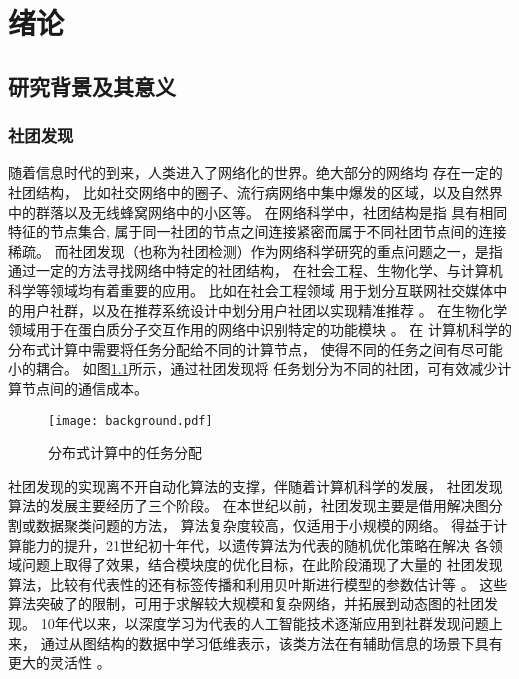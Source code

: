 
\chapter{绪论}


\section{研究背景及其意义}
\subsection{社团发现}
随着信息时代的到来，人类进入了网络化的世界。绝大部分的网络均
存在一定的社团结构\cite{fortunato2010community}，
比如社交网络中的圈子、流行病网络中集中爆发的区域，以及自然界中的群落以及无线蜂窝网络中的小区等。
在网络科学中，社团结构是指
具有相同特征的节点集合, 属于同一社团的节点之间连接紧密而属于不同社团节点间的连接稀疏。
而社团发现（也称为社团检测）作为网络科学研究的重点问题之一，是指通过一定的方法寻找网络中特定的社团结构，
在社会工程、生物化学、与计算机科学等领域均有着重要的应用。
比如在社会工程领域
用于划分互联网社交媒体中的用户社群\cite{6750167}，以及在推荐系统设计中划分用户社团以实现精准推荐 \cite{10.1145/2739480.2754670}。
在生物化学领域用于在蛋白质分子交互作用的网络中识别特定的功能模块 \cite{ayati2015mobas}。
在
计算机科学的分布式计算中需要将任务分配给不同的计算节点，
使得不同的任务之间有尽可能
小的耦合\cite{topcuoglu2002performance}。
如图\ref{fig:distributed_computing}所示，通过社团发现将
任务划分为不同的社团，可有效减少计算节点间的通信成本。

\begin{figure}[!ht]
    \centering
    \texttt{[image: background.pdf]}
    \caption{分布式计算中的任务分配\protect\footnotemark}
    \label{fig:distributed_computing}
\end{figure}


社团发现的实现离不开自动化算法的支撑，伴随着计算机科学的发展，
社团发现算法的发展主要经历了三个阶段。
在本世纪以前，社团发现主要是借用解决图分割或数据聚类问题的方法，
算法复杂度较高，仅适用于小规模的网络。
得益于计算能力的提升，21世纪初十年代，以遗传算法为代表的随机优化策略在解决
各领域问题上取得了效果，结合模块度的优化目标，在此阶段涌现了大量的
社团发现算法，比较有代表性的还有标签传播和利用贝叶斯进行模型的参数估计等 \cite{fortunato2010community}。
这些算法突破了的限制，可用于求解较大规模和复杂网络，并拓展到动态图的社团发现。
10年代以来，以深度学习为代表的人工智能技术逐渐应用到社群发现问题上来，
通过从图结构的数据中学习低维表示，该类方法在有辅助信息的场景下具有更大的灵活性
\cite{Su_2022}。

